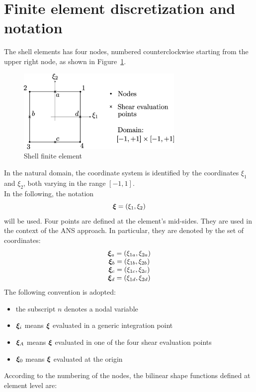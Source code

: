 \section{Finite element discretization and notation}
The shell elements has four nodes, numbered counterclockwise
starting from the upper right node, as shown in Figure~\ref{fig:shell}.
\begin{figure}[htbp]
\centering
\includegraphics[width=8cm]{shellPic.eps}
\caption{Shell finite element}
\label{fig:shell}
\end{figure}
In the natural domain, the coordinate system is identified by the coordinates $\xi_1$ and $\xi_2$, both varying in the range $[-1, 1]$. \\
In the following, the notation
\begin{equation}
\bm{\xi} = \left( \xi_{1},\xi_{2} \right)
\end{equation}
will be used.
Four points are defined at the element's mid-sides.
They are used in the context of the ANS approach.
In particular, they are denoted by the set of coordinates:
\begin{equation}
\vvect{c}{
\T{\xi}_a = \plbr{\xi_{1a},\xi_{2a}} \\
\T{\xi}_b = \plbr{\xi_{1b},\xi_{2b}} \\
\T{\xi}_c = \plbr{\xi_{1c},\xi_{2c}} \\
\T{\xi}_d = \plbr{\xi_{1d},\xi_{2d}}
}
\label{eq:xiSep}
\end{equation}
The following convention is adopted:
\begin{itemize}
	\item the subscript $n$ denotes a nodal variable
  \item $\bm{\xi}_i$ means $\bm{\xi}$ evaluated in a generic integration point
  \item $\bm{\xi}_A$ means $\bm{\xi}$ evaluated in one of the four shear evaluation points
  \item $\bm{\xi}_0$ means $\bm{\xi}$ evaluated at the origin
\end{itemize}
According to the numbering of the nodes, the bilinear shape functions defined at element level are:
